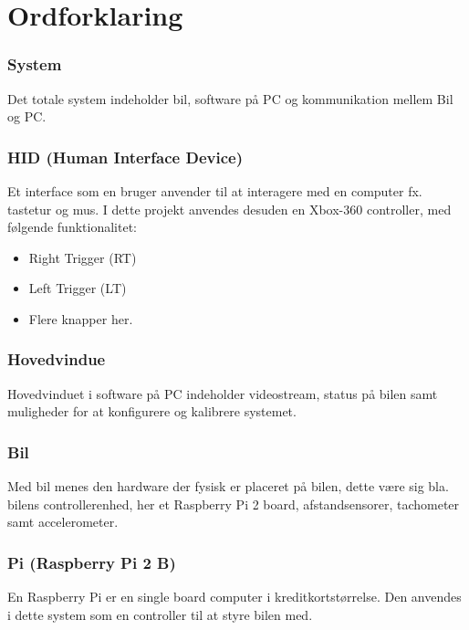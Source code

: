 
\section{Ordforklaring} \label{sec:ordforklaring}

\subsubsection{System}
Det totale system indeholder bil, software på PC og kommunikation mellem Bil og PC.

\subsubsection{HID (Human Interface Device)}
Et interface som en bruger anvender til at interagere med en computer fx. tastetur og mus. I dette projekt anvendes desuden en Xbox-360 controller, med følgende funktionalitet: 

\begin{itemize}
	\item Right Trigger (RT)
	\item Left Trigger (LT)
	\item Flere knapper her.
\end{itemize}


\subsubsection{Hovedvindue}
Hovedvinduet i software på PC indeholder videostream, status på bilen samt muligheder for at konfigurere og kalibrere systemet.

\subsubsection{Bil}
Med bil menes den hardware der fysisk er placeret på bilen, dette være sig bla. bilens controllerenhed, her et Raspberry Pi 2 board, afstandsensorer, tachometer samt accelerometer.

\subsubsection{Pi (Raspberry Pi 2 B)}
En Raspberry Pi er en single board computer i kreditkortstørrelse. Den anvendes i dette system som en controller til at styre bilen med.

